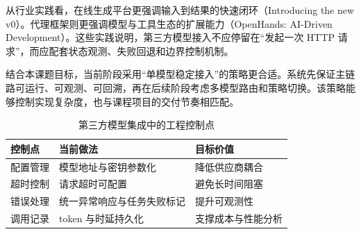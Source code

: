 从行业实践看，在线生成平台更强调输入到结果的快速闭环（Introducing the new v0）\cite{vercel2026newv0}。代理框架则更强调模型与工具生态的扩展能力（OpenHands: AI-Driven Development）\cite{openhands2026github}。这些实践说明，第三方模型接入不应停留在“发起一次 HTTP 请求”，而应配套状态观测、失败回退和边界控制机制。

结合本课题目标，当前阶段采用“单模型稳定接入”的策略更合适。系统先保证主链路可运行、可观测、可回溯，再在后续阶段考虑多模型路由和策略切换。该策略能够控制实现复杂度，也与课程项目的交付节奏相匹配。

\begin{table}[htbp]
\centering
\caption{第三方模型集成中的工程控制点}
\label{tab:chapter2-thirdparty-controls}
\small
\begin{tabular}{@{}p{}p{}p{}@{}}
\toprule
控制点 & 当前做法 & 目标价值 \\
\midrule
配置管理 & 模型地址与密钥参数化 & 降低供应商耦合 \\
超时控制 & 请求超时可配置 & 避免长时间阻塞 \\
错误处理 & 统一异常响应与任务失败标记 & 提升可观测性 \\
调用记录 & token 与时延持久化 & 支撑成本与性能分析 \\
\bottomrule
\end{tabular}
\end{table}
